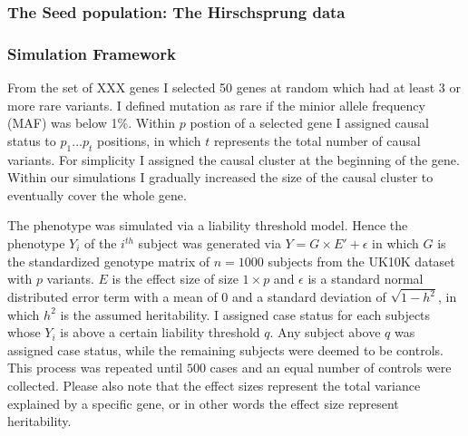 \subsubsection{The Seed population: The Hirschsprung data}
\label{ssub:The_Seed_population:_The_Hirschsprung_data}

\subsubsection{Simulation Framework}
\label{ssub:Simulation_Framework}

From the set of XXX genes I selected 50 genes at random which had at least 3 or more rare variants. 
I defined mutation as rare if the minior allele frequency (MAF) was below 1\%. 
Within $p$ postion of a selected gene I assigned causal status to $p_1 \ldots p_t$ positions, in which $t$ represents the total number of causal variants.
For simplicity I assigned the causal cluster at the beginning of the gene.
Within our simulations I gradually increased the size of the causal cluster to eventually cover the whole gene. 

The phenotype was simulated via a liability threshold model.
Hence the phenotype $Y_i$ of the $i^{th}$ subject was generated via
$Y = G\times E' + \epsilon$
in which $G$ is the standardized genotype matrix of $n=1000$ subjects from the UK10K dataset with $p$ variants.
$E$ is the effect size of size $1\times p$ and $\epsilon$ is a standard normal distributed error term with a mean of $0$ and a standard deviation of $\sqrt{1-h^2}$, in which $h^2$ is the assumed heritability.
I assigned case status for each subjects whose $Y_i$ is above a certain liability threshold $q$.
Any subject above $q$ was assigned case status, while the remaining subjects were deemed to be controls.
This process was repeated until $500$ cases and an equal number of controls were collected.
Please also note that the effect sizes represent the total variance explained by a specific gene, or in other words the effect size represent heritability.
